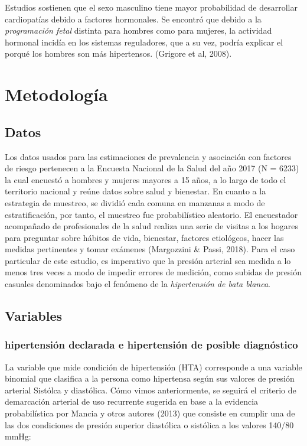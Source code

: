\documentclass{aa}
\begin{document}
Estudios sostienen que el sexo masculino tiene mayor probabilidad de desarrollar cardiopatías debido a factores hormonales. Se encontró que debido a la \textit{programación fetal} distinta para hombres como para mujeres, la actividad hormonal incidía en los sistemas reguladores, que a su vez, podría explicar el porqué los hombres son más hipertensos. (Grigore et al, 2008).

\section{Metodología}

\subsection{Datos}

Los datos usados para las estimaciones de prevalencia y asociación con factores de riesgo pertenecen a la Encuesta Nacional de la Salud del año 2017 (N = 6233) la cual encuestó a hombres y mujeres mayores a 15 años, a lo largo de todo el territorio nacional y reúne datos sobre salud y bienestar. En cuanto a la estrategia de muestreo, se dividió cada comuna en manzanas a modo de estratificación, por tanto, el muestreo fue probabilístico aleatorio. 
El encuestador acompañado de profesionales de la salud realiza una serie de visitas a los hogares para preguntar sobre hábitos de vida, bienestar, factores etiológcos, hacer las medidas pertinentes y tomar exámenes (Margozzini & Passi, 2018). Para el caso particular de este estudio, es imperativo que la presión arterial sea medida a lo menos tres veces a modo de impedir errores de medición, como subidas de presión casuales denominados bajo el fenómeno de la \textit{hipertensión de bata blanca}.

 \subsection{Variables}

\subsubsection{hipertensión declarada e hipertensión de posible diagnóstico}

La variable que mide condición de hipertensión (HTA) corresponde a una variable binomial que clasifica a la persona como hipertensa según sus valores de presión arterial Sistólca y diastólica. Cómo vimos anteriormente, se seguirá el criterio de demarcación arterial de uso recurrente sugerida en base a la evidencia probabilística por Mancia y otros autores (2013) que consiste en cumplir una de las dos condiciones de presión superior diastólica o sistólica a los valores 140/80 mmHg:
\end{document}
